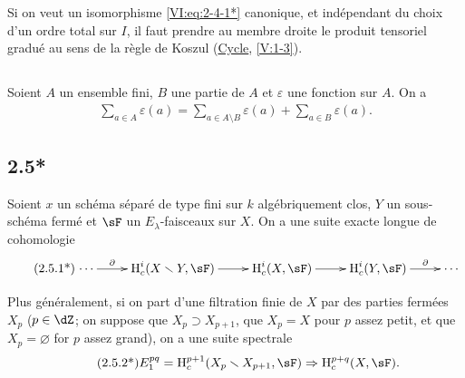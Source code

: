 Si on veut un isomorphisme \eqref{VI:eq:2-4-1*} canonique, et indépendant du 
choix d'un ordre total sur $I$, il faut prendre au membre droite le produit 
tensoriel gradué au sens de la règle de Koszul 
(\hyperref[IV]{Cycle}, \ref{V:1-3}). 





\subsection{}\label{VI:2-5}

Soient $A$ un ensemble fini, $B$ une partie de $A$ et $\varepsilon$ une 
fonction sur $A$. On a 
\begin{align*}\tag{2.5.1}\label{VI:2-5-1}
  \sum_{a\in A} \varepsilon(a) = \sum_{a\in A\setminus B}\varepsilon(a) + \sum_{a\in B} \varepsilon(a) \text{.}
\end{align*}





\subsection*{2.5*}\label{VI:2-5*}

Soient $x$ un schéma séparé de type fini sur $k$ algébriquement clos, 
$Y$ un sous-schéma fermé et $\sF$ un $E_\lambda$-faisceaux sur $X$. On a 
une suite exacte longue de cohomologie 
\begin{align*}\tag{2.5.1*}\label{VI:eq:2-5-1*}
\xymatrix{
  \cdots \ar[r]^-\partial 
    & \h_c^i(X\setminus Y,\sF) \ar[r] 
    & \h_c^i(X,\sF) \ar[r] 
    & \h_c^i(Y,\sF) \ar[r]^-\partial 
    & \cdots 
}
\end{align*}

Plus généralement, si on part d'une filtration finie de $X$ par des parties 
fermées $X_p$ ($p\in \dZ$; on suppose que $X_p\supset X_{p+1}$, que $X_p=X$ 
pour $p$ assez petit, et que $X_p=\varnothing$ for $p$ assez grand), on a une 
suite spectrale 
\begin{align*}\tag{2.5.2*}\label{VI:eq:2-5-2*}
  E_1^{p q} = \h_c^{p+1}(X_p\setminus X_{p+1},\sF) \Rightarrow \h_c^{p+q}(X,\sF) \text{.}
\end{align*}





\subsection{}\label{VI:2-6}

